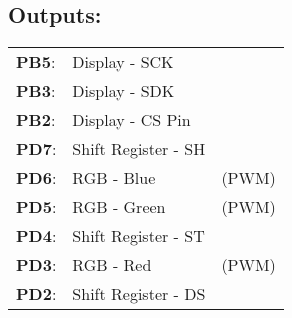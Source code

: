 \documentclass[12pt]{article}
\begin{document}
\subsection*{Outputs:}
\begin{tabular}{ l l l }

   \textbf{PB5}: & Display - SCK & \quad  \\
   \textbf{PB3}: & Display - SDK & \quad  \\
   \textbf{PB2}: & Display - CS Pin \\
   \textbf{PD7}: & Shift Register - SH & \quad  \\
   \textbf{PD6}: & RGB - Blue & \quad (PWM) \\
   \textbf{PD5}: & RGB - Green & \quad (PWM) \\
   \textbf{PD4}: & Shift Register - ST  & \quad  \\
   \textbf{PD3}: & RGB - Red & \quad (PWM) \\
   \textbf{PD2}: & Shift Register - DS & \quad  \\
\end{tabular}

\pagebreak
\end{document}
